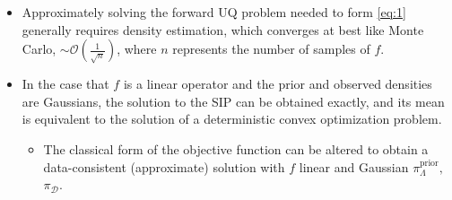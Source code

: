 \documentclass[11pt]{beamer}
\begin{document}
\begin{frame}

\begin{itemize}

	\item %
	Approximately solving the forward UQ problem needed to form \eqref{eq:1} generally requires density estimation, which converges at best like Monte Carlo,  $ \sim \mathcal{O}\left(\frac{1}{\sqrt{n}} \right)$, where $n$ represents the number of samples of $f$.
	
	\item In the case that $f$ is a linear operator and the prior and observed densities are Gaussians, the solution to the SIP can be obtained exactly, and its mean is equivalent to the solution of a deterministic convex optimization problem.
	
	\begin{itemize}
		\item The classical form of the objective function \footnotemark[1] can be altered \footnotemark[2] to obtain a data-consistent (approximate) solution with $f$ linear and Gaussian $\pi_\Lambda^{\text{prior}},$ $\pi_\mathcal{D}$.
	\end{itemize}

\end{itemize}


\end{frame}
\end{document}
